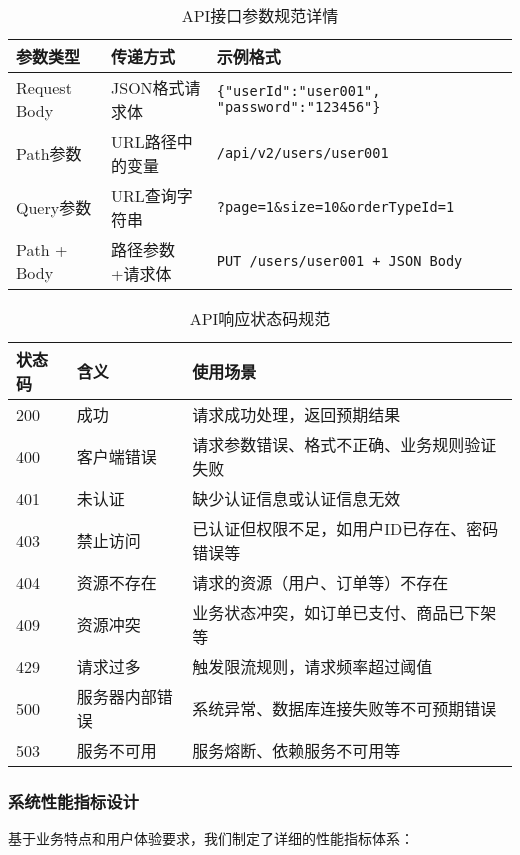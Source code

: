 \documentclass[a4paper,12pt]{article}
\begin{document}
\begin{table}[H]
\centering
\caption{API接口参数规范详情}
\setlength{\tabcolsep}{8pt}
\begin{tabular}{|p{3cm}|p{4cm}|p{6cm}|}
\hline
\rowcolor{gray!20}
\textbf{参数类型} & \textbf{传递方式} & \textbf{示例格式} \\
\hline
Request Body & JSON格式请求体 & \texttt{\{"userId":"user001", "password":"123456"\}} \\
\hline
Path参数 & URL路径中的变量 & \texttt{/api/v2/users/user001} \\
\hline
Query参数 & URL查询字符串 & \texttt{?page=1\&size=10\&orderTypeId=1} \\
\hline
Path + Body & 路径参数+请求体 & \texttt{PUT /users/user001 + JSON Body} \\
\hline
\end{tabular}
\end{table}

\begin{table}[H]
\centering
\caption{API响应状态码规范}
\begin{tabular}{|p{2cm}|p{3cm}|p{8cm}|}
\hline
\textbf{状态码} & \textbf{含义} & \textbf{使用场景} \\
\hline
200 & 成功 & 请求成功处理，返回预期结果 \\
\hline
400 & 客户端错误 & 请求参数错误、格式不正确、业务规则验证失败 \\
\hline
401 & 未认证 & 缺少认证信息或认证信息无效 \\
\hline
403 & 禁止访问 & 已认证但权限不足，如用户ID已存在、密码错误等 \\
\hline
404 & 资源不存在 & 请求的资源（用户、订单等）不存在 \\
\hline
409 & 资源冲突 & 业务状态冲突，如订单已支付、商品已下架等 \\
\hline
429 & 请求过多 & 触发限流规则，请求频率超过阈值 \\
\hline
500 & 服务器内部错误 & 系统异常、数据库连接失败等不可预期错误 \\
\hline
503 & 服务不可用 & 服务熔断、依赖服务不可用等 \\
\hline
\end{tabular}
\end{table}

\subsubsection{系统性能指标设计}

基于业务特点和用户体验要求，我们制定了详细的性能指标体系：
\end{document}
